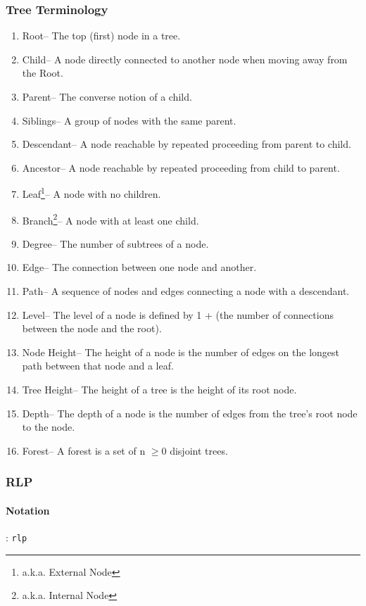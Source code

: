 \documentclass[10pt,a4paper,leqno,bibliography=totoc]{scrartcl}
\newenvironment{alphafootnotes}
{\par\edef\savedfootnotenumber{\number\value{footnote}}
\renewcommand{\thefootnote}{\alph{footnote}}
\setcounter{footnote}{0}}
{\par\setcounter{footnote}{\savedfootnotenumber}}
\begin{document}
\begin{alphafootnotes}
\begin{multicols*}{2}
		\subsubsection{Tree Terminology\supercite{wiki:xxx}}
		\begin{enumerate}[label=\textbf{\alph*})]
			\item Root--  The top (first) node in a tree.
			\item	Child--  A node directly connected to another node when moving away from the Root.
			\item	Parent--  The converse notion of a child.
			\item	Siblings--  A group of nodes with the same parent.
			\item	Descendant--  A node reachable by repeated proceeding from parent to child.
			\item	Ancestor--  A node reachable by repeated proceeding from child to parent.
			\item	Leaf\footnote{a.k.a. External Node}--  A node with no children.
			\item	Branch\footnote{a.k.a. Internal Node}--  A node with at least one child.
			\item	Degree--  The number of subtrees of a node.
			\item	Edge--  The connection between one node and another.
			\item	Path--  A sequence of nodes and edges connecting a node with a descendant.
			\item	Level--  The level of a node is defined by 1 + (the number of connections between the node and the root).
			\item	Node Height--  The height of a node is the number of edges on the longest path between that node and a leaf.
			\item	Tree Height--  The height of a tree is the height of its root node.
			\item	Depth--  The depth of a node is the number of edges from the tree's root node to the node.
			\item Forest-- A forest is a set of n $\geq  0$ disjoint trees.
		\end{enumerate}

			\subsubsection{RLP}
			\paragraph{Notation}: \texttt{rlp}

\end{multicols*}
\end{alphafootnotes}
\end{document}
